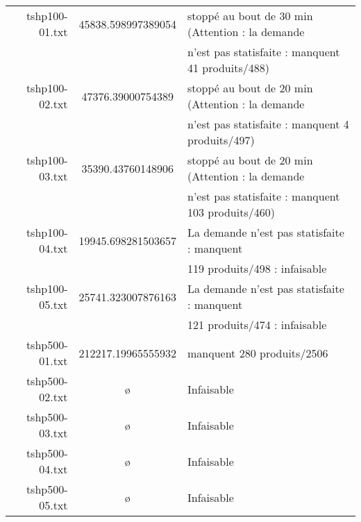 \documentclass[a4paper,12pt]{article}
\begin{document}
\begin{center}
\begin{tabular}{r | c | l}
tshp100-01.txt & 45838.598997389054 & stopp\'e au bout de 30 min (Attention : la demande \\
& & n'est pas statisfaite : manquent 41 produits/488) \\
tshp100-02.txt & 47376.39000754389 & stopp\'e au bout de 20 min (Attention : la demande \\
& & n'est pas statisfaite : manquent 4 produits/497) \\
tshp100-03.txt & 35390.43760148906 & stopp\'e au bout de 20 min (Attention : la demande \\
& & n'est pas statisfaite : manquent 103 produits/460) \\
tshp100-04.txt & 19945.698281503657 & La demande n'est pas statisfaite : manquent \\
& & 119 produits/498 : infaisable \\
tshp100-05.txt & 25741.323007876163 & La demande n'est pas statisfaite : manquent \\
& & 121 produits/474 : infaisable \\
tshp500-01.txt & 212217.19965555932 & manquent 280 produits/2506 \\
tshp500-02.txt & \o{} & Infaisable \\
tshp500-03.txt & \o{} & Infaisable \\
tshp500-04.txt & \o{} & Infaisable \\
tshp500-05.txt & \o{} & Infaisable \\
  
 \end{tabular}

\end{center}
\end{document}
